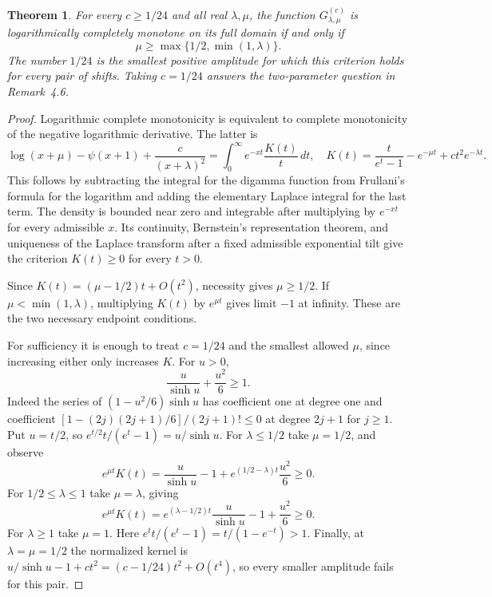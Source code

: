 \documentclass[11pt,a4paper]{article}
\newtheorem{theorem}{Theorem}[section]
\numberwithin{equation}{section}
\begin{document}
\begin{theorem}\label{th:qiluo}
For every $c\ge1/24$ and all real $\lambda,\mu$, the function
$G^{(c)}_{\lambda,\mu}$ is logarithmically completely monotone on its
full domain if and only if
\[
 \mu\ge \max\{1/2,\min(1,\lambda)\}.
\]
The number $1/24$ is the smallest positive amplitude for which this
criterion holds for every pair of shifts. Taking $c=1/24$ answers the
two-parameter question in Remark~4.6.
\end{theorem}
\begin{proof}
Logarithmic complete monotonicity is equivalent to complete
monotonicity of the negative logarithmic derivative. The latter is
\[
 \log(x+\mu)-\psi(x+1)+\frac{c}{(x+\lambda)^2}
    =\int_0^\infty e^{-xt}\frac{K(t)}{t}\,dt,
 \quad K(t)=\frac{t}{e^t-1}-e^{-\mu t}+ct^2e^{-\lambda t}.
\]
This follows by subtracting the integral for the digamma function
from Frullani's formula for the logarithm and adding the elementary
Laplace integral for the last term. The density is bounded near zero
and integrable after multiplying by $e^{-xt}$ for every admissible
$x$. Its continuity, Bernstein's representation theorem, and uniqueness
of the Laplace transform after a fixed admissible exponential tilt
give the criterion $K(t)\ge0$ for every $t>0$.

Since $K(t)=(\mu-1/2)t+O(t^2)$, necessity gives $\mu\ge1/2$.
If $\mu<\min(1,\lambda)$, multiplying $K(t)$ by $e^{\mu t}$ gives
limit $-1$ at infinity. These are the two necessary endpoint conditions.

For sufficiency it is enough to treat $c=1/24$ and the smallest
allowed $\mu$, since increasing either only increases $K$. For $u>0$,
\[
 \frac{u}{\sinh u}+\frac{u^2}{6}\ge1.
\]
Indeed the series of $(1-u^2/6)\sinh u$ has coefficient one at
degree one and coefficient
$[1-(2j)(2j+1)/6]/(2j+1)!\le0$ at degree $2j+1$ for $j\ge1$.
Put $u=t/2$, so $e^{t/2}t/(e^t-1)=u/\sinh u$.
For $\lambda\le1/2$ take $\mu=1/2$, and observe
\[
 e^{\mu t}K(t)=\frac{u}{\sinh u}-1
       +e^{(1/2-\lambda)t}\frac{u^2}{6}\ge0.
\]
For $1/2\le\lambda\le1$ take $\mu=\lambda$, giving
\[
 e^{\mu t}K(t)=e^{(\lambda-1/2)t}\frac{u}{\sinh u}
                    -1+\frac{u^2}{6}\ge0.
\]
For $\lambda\ge1$ take $\mu=1$. Here
$e^t t/(e^t-1)=t/(1-e^{-t})>1$.
Finally, at $\lambda=\mu=1/2$ the normalized kernel is
$u/\sinh u-1+ct^2=(c-1/24)t^2+O(t^4)$,
so every smaller amplitude fails for this pair.
\end{proof}
\end{document}
